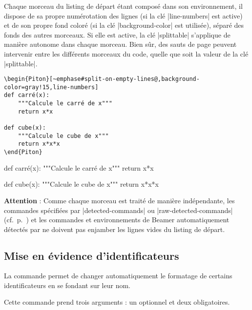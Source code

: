 \documentclass[dvipsnames,svgnames]{article}
\begin{document}
\smallskip
Chaque morceau du listing de départ étant composé dans son environnement, il dispose de sa
propre numérotation des lignes (si la clé |line-numbers| est active) et de son propre fond
coloré (si la clé |background-color| est utilisée), séparé des fonds des autres morceaux.
Si elle est active, la clé |splittable| s'applique de manière autonome dans chaque
morceau. Bien sûr, des sauts de page peuvent intervenir entre les différents morceaux du
code, quelle que soit la valeur de la clé |splittable|.

\bigskip
\begin{Verbatim}
\begin{Piton}[~emphase#split-on-empty-lines@,background-color=gray!15,line-numbers]
def carré(x):
    """Calcule le carré de x"""
    return x*x

def cube(x):
    """Calcule le cube de x"""
    return x*x*x
\end{Piton}
\end{Verbatim}


\begin{Piton}[split-on-empty-lines,background-color=gray!15,line-numbers]
def carré(x):
    """Calcule le carré de x"""
    return x*x

def cube(x):
    """Calcule le cube de x"""
    return x*x*x
\end{Piton}


\bigskip
\textbf{Attention} : Comme chaque morceau est traité de manière indépendante, les
commandes spécifiées par |detected-commands| ou |raw-detected-commands|
(cf.~p.~\pageref{detected-commands}) et les commandes et environnements de Beamer
automatiquement détectés par  ne doivent pas enjamber les lignes vides du
listing de départ.


\bigskip
\subsection{Mise en évidence d'identificateurs}

\label{SetPitonIdentifier}

La commande  permet de changer automatiquement le
formatage de certains identificateurs en se fondant sur leur nom.

\smallskip
Cette commande prend trois arguments : un optionnel et deux obligatoires.
\end{document}
